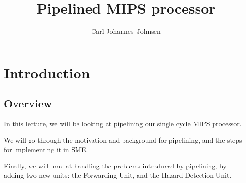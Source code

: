 \documentclass{beamer}
\title{Pipelined MIPS processor}
\author[Carl-Johannes Johnsen]{
  \mbox{Carl-Johannes Johnsen}}
\institute{Department of Computer Science\\
           University of Copenhagen}
\begin{document}
\frame{\titlepage}

\section{Introduction}
\subsection{Overview}
\begin{frame}
    In this lecture, we will be looking at pipelining our single cycle MIPS
    processor.

    \vspace{\baselineskip}
    We will go through the motivation and background for pipelining, and the
    steps for implementing it in SME.

    \vspace{\baselineskip}
    Finally, we will look at handling the problems introduced by pipelining, by
    adding two new units: the Forwarding Unit, and the Hazard Detection Unit.
\end{frame}
\end{document}
